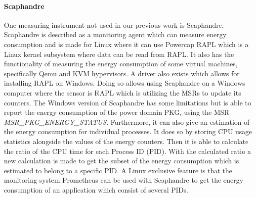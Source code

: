 \paragraph{Scaphandre}
One measuring instrument not used in our previous work is Scaphandre\cite{scaphandre}. Scaphandre is described as a monitoring agent which can measure energy consumption and is made for Linux where it can use Powercap RAPL which is a Linux kernel subsystem where data can be read from RAPL. It also has the functionality of measuring the energy consumption of some virtual machines, specifically Qemu and KVM hypervisors. A driver also exists which allows for installing RAPL on Windows.\cite{RAPL_Windows} Doing so allows using Scaphandre on a Windows computer where the sensor is RAPL which is utilizing the MSRs to update its counters. The Windows version of Scaphandre has some limitations but is able to report the energy consumption of the power domain PKG, using the MSR \textit{MSR\_PKG\_ENERGY\_STATUS}. Furthermore, it can also give an estimation of the energy consumption for individual processes. It does so by storing CPU usage statistics alongside the values of the energy counters. Then it is able to calculate the ratio of the CPU time for each Process ID (PID). With the calculated ratio a new calculation is made to get the subset of the energy consumption which is estimated to belong to a specific PID. A Linux exclusive feature is that the monitoring system Prometheus can be used with Scaphandre to get the energy consumption of an application which consist of several PIDs.

